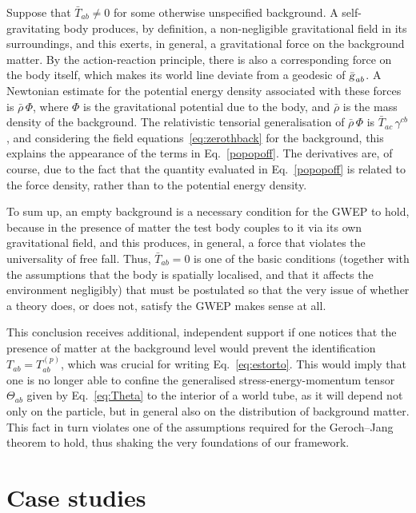 \documentclass[a4paper,showkeys,aps,prd,reprint,nofootinbib,showpacs,twocolumn]{revtex4-1}
\newcommand{\eq}[1]{\( #1 \)}
\newcommand{\matg}{\text{\textsl{g}}}%
\theoremstyle{plain}
\begin{document}
Suppose that \eq{\bar{T}_{ab} \neq 0} for some otherwise unspecified background.  A self-gravitating body produces, by definition, a non-negligible gravitational field in its surroundings, and this exerts, in general, a gravitational force on the background matter.  By the action-reaction principle, there is also a corresponding force on the body itself, which makes its world line deviate from a geodesic of \eq{\bar{\matg}_{ab}}.  A Newtonian estimate for the potential energy density associated with these forces is \eq{\bar{\rho} \, \Phi}, where \eq{\Phi} is the gravitational potential due to the body, and \eq{\bar{\rho}} is the mass density of the background.  The relativistic tensorial generalisation of \eq{\bar{\rho} \, \Phi} is \eq{\bar{T}_{ac} \, \gamma^{cb}}, and considering the field equations~\eqref{eq:zerothback} for the background,  this explains the appearance of the terms in Eq.~\eqref{popopoff}.  The derivatives are, of course, due to the fact that the quantity evaluated in Eq.~\eqref{popopoff} is related to the force density, rather than to the potential energy density.

To sum up, an empty background is a necessary condition for the GWEP to hold, because in the presence of matter the test body couples to it via its own gravitational field, and this produces, in general, a force that violates the universality of free fall.  Thus, \eq{\bar{T}_{ab} = 0} is one of the basic conditions (together with the assumptions that the body is spatially localised, and that it affects the environment negligibly) that must be postulated so that the very issue of whether a theory does, or does not, satisfy the GWEP makes sense at all.

This conclusion receives additional, independent support if one notices that the presence of matter at the background level would prevent the identification \eq{T_{ab} = T^{(p)}_{ab}}, which was crucial for writing Eq.~\eqref{eq:estorto}.  This would imply that one is no longer able to confine the generalised stress-energy-momentum tensor \eq{\Theta_{ab}} given by Eq.~\eqref{eq:Theta} to the interior of a world tube, as it will depend not only on the particle, but in general also on the distribution of background matter.  This fact in turn violates one of the assumptions required for the Geroch--Jang theorem to hold, thus shaking the very foundations of our framework.

\section{Case studies}
\label{S:6}
\end{document}
